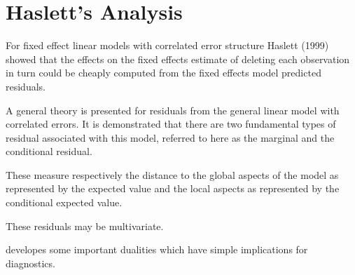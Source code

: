 \documentclass[00-MASTER.tex]{subfiles}
\begin{document}
\section{Haslett's Analysis} %
For fixed effect linear models with correlated error structure Haslett (1999) showed that the effects on
the fixed effects estimate of deleting each observation in turn could be cheaply computed from the fixed effects model predicted residuals.


A general theory is presented for residuals from the general linear model with correlated errors. 
It is demonstrated that there are two fundamental types of residual associated with this model, 
referred to here as the marginal and the conditional residual. 

These measure respectively the distance to the global aspects of the model as represented by the expected value 
and the local aspects as represented by the conditional expected value. 

These residuals may be multivariate. 

\citet{HaslettHayes} developes some important dualities which have simple implications for diagnostics. 

\end{document}

